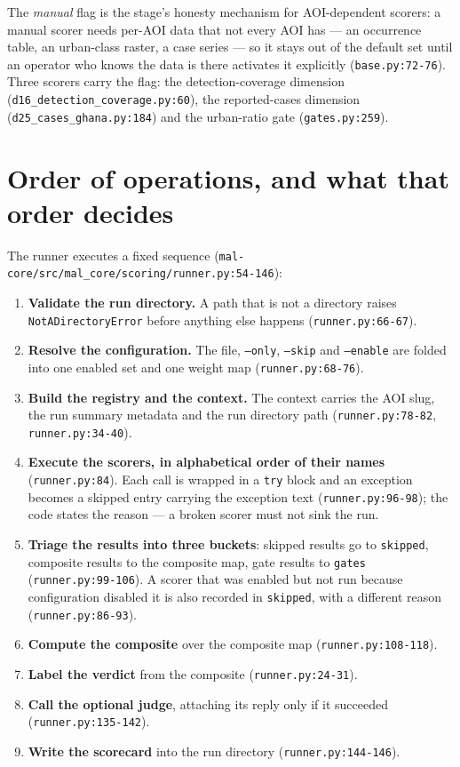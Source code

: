 \documentclass[11pt,a4paper]{article}
\newcommand{\code}[1]{\texttt{#1}}
\begin{document}
The \emph{manual} flag is the stage's honesty mechanism for AOI-dependent
scorers: a manual scorer needs per-AOI data that not every AOI has --- an
occurrence table, an urban-class raster, a case series --- so it stays out
of the default set until an operator who knows the data is there activates
it explicitly (\code{base.py:72-76}). Three scorers carry the flag: the
detection-coverage dimension
(\code{d16\_detection\_coverage.py:60}), the reported-cases dimension
(\code{d25\_cases\_ghana.py:184}) and the urban-ratio gate
(\code{gates.py:259}).

\section{Order of operations, and what that order decides}

The runner executes a fixed sequence
(\code{mal-core/src/mal\_core/scoring/runner.py:54-146}):

\begin{enumerate}
\item \textbf{Validate the run directory.} A path that is not a directory
      raises \code{NotADirectoryError} before anything else happens
      (\code{runner.py:66-67}).
\item \textbf{Resolve the configuration.} The file, \code{--only},
      \code{--skip} and \code{--enable} are folded into one enabled set and
      one weight map (\code{runner.py:68-76}).
\item \textbf{Build the registry and the context.} The context carries the
      AOI slug, the run summary metadata and the run directory path
      (\code{runner.py:78-82}, \code{runner.py:34-40}).
\item \textbf{Execute the scorers, in alphabetical order of their names}
      (\code{runner.py:84}). Each call is wrapped in a \code{try} block and
      an exception becomes a skipped entry carrying the exception text
      (\code{runner.py:96-98}); the code states the reason --- a broken
      scorer must not sink the run.
\item \textbf{Triage the results into three buckets}: skipped results go to
      \code{skipped}, composite results to the composite map, gate results
      to \code{gates} (\code{runner.py:99-106}). A scorer that was enabled
      but not run because configuration disabled it is also recorded in
      \code{skipped}, with a different reason (\code{runner.py:86-93}).
\item \textbf{Compute the composite} over the composite map
      (\code{runner.py:108-118}).
\item \textbf{Label the verdict} from the composite (\code{runner.py:24-31}).
\item \textbf{Call the optional judge}, attaching its reply only if it
      succeeded (\code{runner.py:135-142}).
\item \textbf{Write the scorecard} into the run directory
      (\code{runner.py:144-146}).
\end{enumerate}
\end{document}
